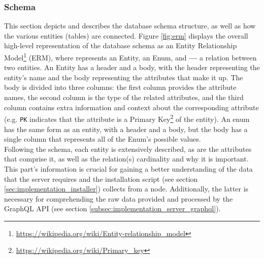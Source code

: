 \subsubsection{Schema}
\label{subsubsec:implementation_server_database_schema}

This section depicts and describes the database schema structure, as well as how
the various entities (tables) are connected. Figure \ref{fig:erm} displays the overall
high-level representation of the database schema as an Entity Relationship Model\footnote{\url{https://wikipedia.org/wiki/Entity-relationship_model}}
(ERM), where 
represents an Entity, 
an Enum, and \textbf{---} a relation between two entities. An Entity has a
header and a body, with the header representing the entity's name and the body representing
the attributes that make it up. The body is divided into three columns: the first
column provides the attribute names, the second column is the type of the
related attributes, and the third column contains extra information and context about
the corresponding attribute (e.g. \texttt{PK} indicates that the attribute is a
Primary Key\footnote{\url{https://wikipedia.org/wiki/Primary_key}} of the entity).
An enum has the same form as an entity, with a header and a body, but the body
has a single column that represents all of the Enum's possible values. \\ %
Following the schema, each entity is extensively described, as are the
attributes that comprise it, as well as the relation(s) cardinality and why it
is important. \\ %
This part's information is crucial for gaining a better understanding of the
data that the server requires and the installation script (see section \ref{sec:implementation_installer})
collects from a node. Additionally, the latter is necessary for comprehending
the raw data provided and processed by the GraphQL API (see section \ref{subsec:implementation_server_graphql}).

\pagebreak


